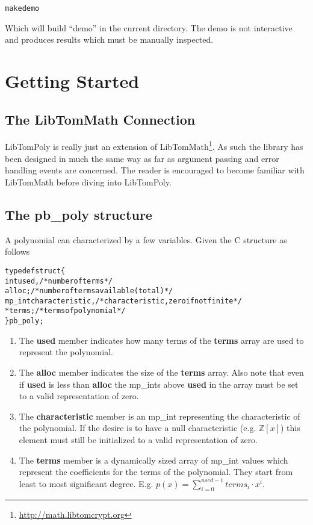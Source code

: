 \documentclass[b5paper]{book}
\def\Z{{\mathbb Z}}
\begin{document}
\begin{alltt}
make demo
\end{alltt}

Which will build ``demo'' in the current directory.  The demo is not interactive and produces results which must be manually
inspected.

\chapter{Getting Started}

\section{The LibTomMath Connection}
LibTomPoly is really just an extension of LibTomMath\footnote{\url{http://math.libtomcrypt.org}}.  As such the library has 
been designed in much the same way as far as argument passing and error handling events are concerned.  The reader is 
encouraged to become familiar with LibTomMath before diving into LibTomPoly.

\section{The pb\_poly structure}
A polynomial can characterized by a few variables.  Given the C structure as follows

\begin{alltt}
typedef struct \{
   int    used,                  /* number of terms */
          alloc;                 /* number of terms available (total) */
   mp_int characteristic,        /* characteristic, zero if not finite */
          *terms;                /* terms of polynomial */
\} pb_poly;
\end{alltt}

\begin{enumerate}
   \item The \textbf{used} member indicates how many terms of the \textbf{terms} array are used to represent the polynomial.
   \item The \textbf{alloc} member indicates the size of the \textbf{terms} array.  Also note that even if \textbf{used}
         is less than \textbf{alloc} the mp\_ints above \textbf{used} in the array must be set to a valid representation 
         of zero.
   \item The \textbf{characteristic} member is an mp\_int representing the characteristic of the polynomial.  If the desire is to
         have a null characteristic (e.g. $\Z[x]$) this element must still be initialized to a valid representation
         of zero. 
   \item The \textbf{terms} member is a dynamically sized array of mp\_int values which represent the coefficients for
         the terms of the polynomial.  They start from least to most significant degree.  E.g. $p(x) = \sum_{i=0}^{used-1} terms_i \cdot x^i$.
\end{enumerate}
\end{document}
